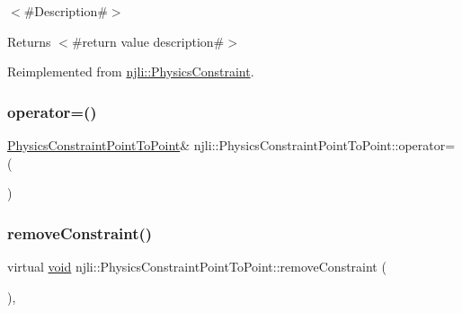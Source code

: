 $<$\#\+Description\#$>$

\begin{DoxyReturn}{Returns}
$<$\#return value description\#$>$ 
\end{DoxyReturn}


Reimplemented from \mbox{\hyperlink{classnjli_1_1_physics_constraint_a4cb967ebae1b139bc7511bc9fcc074c5}{njli\+::\+Physics\+Constraint}}.

\mbox{\label{classnjli_1_1_physics_constraint_point_to_point_a74aa555b80e55dbb4700e9f230bda563}} 
\subsubsection{\texorpdfstring{operator=()}{operator=()}}
{\footnotesize\ttfamily \mbox{\hyperlink{classnjli_1_1_physics_constraint_point_to_point}{Physics\+Constraint\+Point\+To\+Point}}\& njli\+::\+Physics\+Constraint\+Point\+To\+Point\+::operator= (\begin{DoxyParamCaption}\item[{const \mbox{\hyperlink{classnjli_1_1_physics_constraint_point_to_point}{Physics\+Constraint\+Point\+To\+Point}} \&}]{ }\end{DoxyParamCaption})\hspace{0.3cm}{\ttfamily [protected]}}

\mbox{\label{classnjli_1_1_physics_constraint_point_to_point_a337401a0a9ad667b5d7c952913c40852}} 
\subsubsection{\texorpdfstring{remove\+Constraint()}{removeConstraint()}}
{\footnotesize\ttfamily virtual \mbox{\hyperlink{_thread_8h_af1e856da2e658414cb2456cb6f7ebc66}{void}} njli\+::\+Physics\+Constraint\+Point\+To\+Point\+::remove\+Constraint (\begin{DoxyParamCaption}{ }\end{DoxyParamCaption})\hspace{0.3cm}{\ttfamily [protected]}, {\ttfamily [virtual]}}



